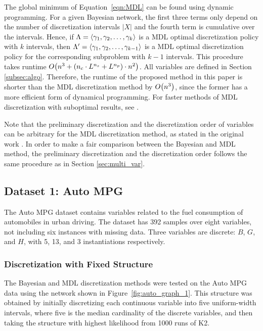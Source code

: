 The global minimum of Equation~\ref{eqn:MDL} can be found using dynamic programming.
For a given Bayesian network, the first three terms only depend on the number of discretization intervals $|X|$ and the fourth term is cumulative over the intervals.
Hence, if $\Lambda = \langle \gamma_1, \gamma_2, \ldots, \gamma_k \rangle$ is a MDL optimal discretization policy with $k$ intervals, then $\Lambda' = \langle \gamma_1, \gamma_2, \ldots, \gamma_{k-1} \rangle$ is a MDL optimal discretization policy for the corresponding subproblem with $k-1$ intervals.
This procedure takes runtime $\bigo \paren{ n^3 + \paren{ n_c \cdot {L}^{n_s}  + {L}^{n_p}} \cdot n^2 }$.
All variables are defined in Section \ref{subsec:algo}.
Therefore, the runtime of the proposed method in this paper is shorter than the MDL discretization method by $\bigo \paren{n^3}$, since the former has a more efficient form of dynamical programming.
For faster methods of MDL discretization with suboptimal results, see \citet{Friedman_1996}.

Note that the preliminary discretization and the discretization order of variables can be arbitrary for the MDL discretization method, as stated in the original work \citep{Friedman_1996}. In order to make a fair comparison between the Bayesian and MDL method, the preliminary discretization and the discretization order follows the same procedure as in Section \ref{sec:multi_var}.

\subsection{Dataset 1: Auto MPG}
\label{subsec:auto}

The Auto MPG dataset contains variables related to the fuel consumption of automobiles in urban driving.
The dataset has \num{392} samples over eight variables, not including six instances with missing data.
Three variables are discrete: $B$, $G$, and $H$, with \num{5}, \num{13}, and \num{3} instantiations respectively.

\subsubsection{Discretization with Fixed Structure}
\label{subsubsec:auto_exp1}

The Bayesian and MDL discretization methods were tested on the Auto MPG data using the network shown in Figure~\ref{fig:auto_graph_1}.
This structure was obtained by initially discretizing each continuous variable into five uniform-width intervals, where five is the median cardinality of the discrete variables, and then taking the structure with highest likelihood from \num{1000} runs of K2.

